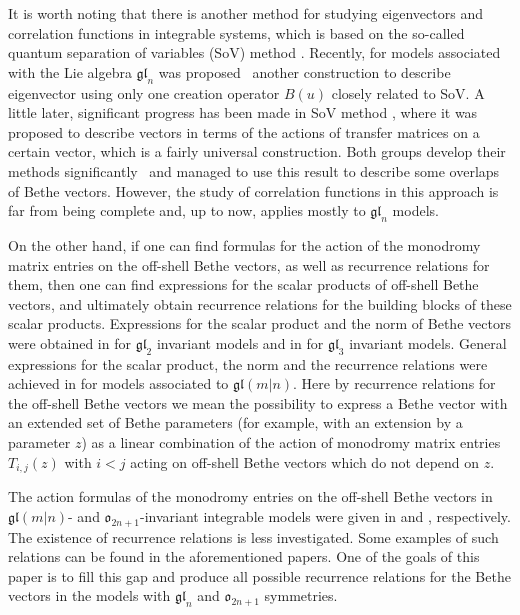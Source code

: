 \documentclass[10pt,a4paper]{amsart}
\theoremstyle{definition}
\begin{document}
It is worth noting that there is another method for studying eigenvectors and correlation functions in integrable systems, which is based on the so-called quantum separation of variables (SoV) method \cite{Sk90, Sk95}. Recently,
for models associated with the Lie algebra $\mathfrak{gl}_n$ was proposed~\cite{GLMS17} another construction to describe eigenvector using only one creation operator $B(u)$ closely related to SoV.
A little later, significant progress has been made in SoV method \cite{MN18}, where it was proposed to describe vectors in terms of the actions of transfer matrices on a certain vector, which is a fairly universal construction.
Both groups develop their methods significantly~\cite{GLMR20, MNV20, RV21} and managed to use this result to describe some overlaps of Bethe vectors.
However, the study of correlation functions in this approach is far from being complete and, up to now, applies mostly to $\mathfrak{gl}_n$ models.

On the other hand, if one can find formulas for the action of the
monodromy matrix entries on the off-shell Bethe vectors, as well as recurrence relations
for them, then one can find expressions for the scalar products of off-shell Bethe vectors, and ultimately obtain recurrence relations for the building blocks
of these scalar products. Expressions for the scalar product and the norm of Bethe vectors were obtained in \cite{IzeK84,Kor82} for $\mathfrak{gl}_2$ invariant models and in \cite{Res86} for $\mathfrak{gl}_3$ invariant models.
General expressions for the scalar product, the norm and the recurrence relations were achieved in \cite{HLPRS-SP17,HLPRS-SP18} for models associated to $\mathfrak{gl}(m|n)$.
Here by recurrence relations for the off-shell Bethe
vectors we mean the possibility to express a Bethe vector
with an extended set of Bethe parameters (for example, with an extension by a parameter $z$)
as a linear combination of the action of monodromy matrix entries $T_{i,j}(z)$ with
$i<j$ acting on off-shell Bethe vectors which do not depend on $z$.

The action formulas of the monodromy entries on the off-shell Bethe vectors
in $\mathfrak{gl}(m|n)$- and $\mathfrak{o}_{2n+1}$-invariant integrable models
were given in \cite{HLPRS17b} and \cite{LP2}, respectively.
The existence of recurrence relations is less investigated. Some examples
of such relations can be found in the aforementioned papers. One of
the goals of this paper is to fill this gap and produce all possible
recurrence relations for the Bethe vectors in the models
with $\mathfrak{gl}_{n}$ and $\mathfrak{o}_{2n+1}$ symmetries.
\end{document}
